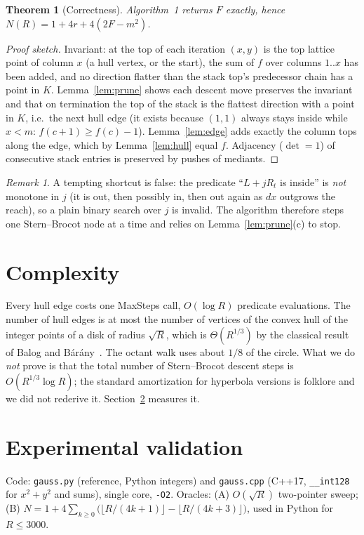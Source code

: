 \documentclass[11pt]{article}
\newtheorem{theorem}{Theorem}
\theoremstyle{remark}
\newtheorem{remark}{Remark}
\begin{document}
\begin{theorem}[Correctness]\label{thm:corr}
Algorithm~1 returns $F$ exactly, hence $N(R)=1+4r+4(2F-m^2)$.
\end{theorem}
\begin{proof}[Proof sketch]
Invariant: at the top of each iteration $(x,y)$ is the top lattice point of column $x$ (a hull vertex, or the start), the sum of $f$ over columns $1..x$ has been added, and no direction flatter than the stack top's predecessor chain has a point in $K$. Lemma~\ref{lem:prune} shows each descent move preserves the invariant and that on termination the top of the stack is the flattest direction with a point in $K$, i.e.\ the next hull edge (it exists because $(1,1)$ always stays inside while $x<m$: $f(c+1)\ge f(c)-1$). Lemma~\ref{lem:edge} adds exactly the column tops along the edge, which by Lemma~\ref{lem:hull} equal $f$. Adjacency ($\det=1$) of consecutive stack entries is preserved by pushes of mediants.
\end{proof}

\begin{remark}
A tempting shortcut is false: the predicate ``$L+jR_t$ is inside'' is \emph{not} monotone in $j$ (it is out, then possibly in, then out again as $dx$ outgrows the reach), so a plain binary search over $j$ is invalid. The algorithm therefore steps one Stern--Brocot node at a time and relies on Lemma~\ref{lem:prune}(c) to stop.
\end{remark}

\section{Complexity}
Every hull edge costs one MaxSteps call, $O(\log R)$ predicate evaluations. The number of hull edges is at most the number of vertices of the convex hull of the integer points of a disk of radius $\sqrt R$, which is $\Theta(R^{1/3})$ by the classical result of Balog and B\'ar\'any~\cite{balogbarany}. The octant walk uses about $1/8$ of the circle. What we do \emph{not} prove is that the total number of Stern--Brocot descent steps is $O(R^{1/3}\log R)$; the standard amortization for hyperbola versions is folklore and we did not rederive it. Section~\ref{sec:exp} measures it.

\section{Experimental validation}\label{sec:exp}
Code: \texttt{gauss.py} (reference, Python integers) and \texttt{gauss.cpp} (C++17, \texttt{\_\_int128} for $x^2+y^2$ and sums), single core, \texttt{-O2}. Oracles: (A) $O(\sqrt R)$ two-pointer sweep; (B) $N=1+4\sum_{k\ge0}\bigl(\lfloor R/(4k+1)\rfloor-\lfloor R/(4k+3)\rfloor\bigr)$, used in Python for $R\le3000$.
\end{document}
